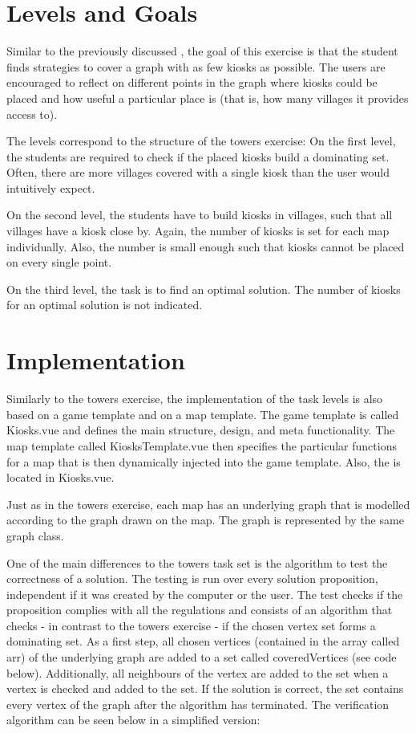 \section{Levels and Goals}
\label{section:assignment}

Similar to the previously discussed , the goal of this exercise is that the student finds strategies to cover a graph with as few kiosks as possible. The users are encouraged to reflect on different points in the graph where kiosks could be placed and how useful a particular place is (that is, how many villages it provides access to). 

The levels correspond to the structure of the towers exercise: On the first level, the students are required to check if the placed kiosks build a dominating set. Often, there are more villages covered with a single kiosk than the user would intuitively expect.

On the second level, the students have to build kiosks in villages, such that all villages have a kiosk close by. Again, the number of kiosks is set for each map individually. Also, the number is small enough such that kiosks cannot be placed on every single point.

On the third level, the task is to find an optimal solution. The number of kiosks for an optimal solution is not indicated.


\section{Implementation}
\label{section:implementation}
Similarly to the towers exercise, the implementation of the task levels is also based on a game template and on a map template. The game template is called Kiosks.vue and defines the main structure, design, and meta functionality. The map template called KiosksTemplate.vue then specifies the particular functions for a map that is then dynamically injected into the game template. Also, the  is located in Kiosks.vue.

Just as in the towers exercise, each map has an underlying graph that is modelled according to the graph drawn on the map. The graph is represented by the same graph class.

One of the main differences to the towers task set is the algorithm to test the correctness of a solution. The testing is run over every solution proposition, independent if it was created by the computer or the user. The test checks if the proposition complies with all the regulations and consists of an algorithm that checks - in contrast to the towers exercise - if the chosen vertex set forms a dominating set. As a first step, all chosen vertices (contained in the array called arr) of the underlying graph are added to a set called coveredVertices (see code below). Additionally, all neighbours of the vertex are added to the set when a vertex is checked and added to the set. If the solution is correct, the set contains every vertex of the graph after the algorithm has terminated. The verification algorithm can be seen below in a simplified version:

